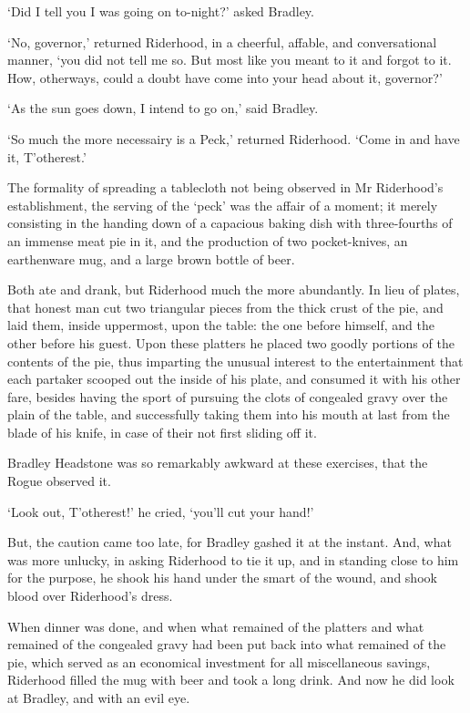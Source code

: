 ‘Did I tell you I was going on to-night?’ asked Bradley.

‘No, governor,’ returned Riderhood, in a cheerful, affable, and
conversational manner, ‘you did not tell me so. But most like you meant
to it and forgot to it. How, otherways, could a doubt have come into
your head about it, governor?’

‘As the sun goes down, I intend to go on,’ said Bradley.

‘So much the more necessairy is a Peck,’ returned Riderhood. ‘Come in
and have it, T’otherest.’

The formality of spreading a tablecloth not being observed in Mr
Riderhood’s establishment, the serving of the ‘peck’ was the affair of
a moment; it merely consisting in the handing down of a capacious baking
dish with three-fourths of an immense meat pie in it, and the production
of two pocket-knives, an earthenware mug, and a large brown bottle of
beer.

Both ate and drank, but Riderhood much the more abundantly. In lieu of
plates, that honest man cut two triangular pieces from the thick crust
of the pie, and laid them, inside uppermost, upon the table: the one
before himself, and the other before his guest. Upon these platters he
placed two goodly portions of the contents of the pie, thus imparting
the unusual interest to the entertainment that each partaker scooped out
the inside of his plate, and consumed it with his other fare, besides
having the sport of pursuing the clots of congealed gravy over the plain
of the table, and successfully taking them into his mouth at last from
the blade of his knife, in case of their not first sliding off it.

Bradley Headstone was so remarkably awkward at these exercises, that the
Rogue observed it.

‘Look out, T’otherest!’ he cried, ‘you’ll cut your hand!’

But, the caution came too late, for Bradley gashed it at the instant.
And, what was more unlucky, in asking Riderhood to tie it up, and in
standing close to him for the purpose, he shook his hand under the smart
of the wound, and shook blood over Riderhood’s dress.

When dinner was done, and when what remained of the platters and what
remained of the congealed gravy had been put back into what remained of
the pie, which served as an economical investment for all miscellaneous
savings, Riderhood filled the mug with beer and took a long drink. And
now he did look at Bradley, and with an evil eye.


